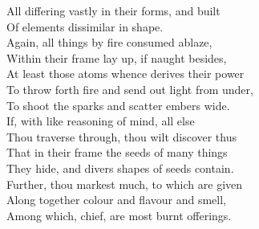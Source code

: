 All differing vastly in their forms, and built\\
Of elements dissimilar in shape.\\
Again, all things by fire consumed ablaze,\\
Within their frame lay up, if naught besides,\\
At least those atoms whence derives their power\\
To throw forth fire and send out light from under,\\
To shoot the sparks and scatter embers wide.\\
If, with like reasoning of mind, all else\\
Thou traverse through, thou wilt discover thus\\
That in their frame the seeds of many things\\
They hide, and divers shapes of seeds contain.\\
Further, thou markest much, to which are given\\
Along together colour and flavour and smell,\\
Among which, chief, are most burnt offerings.

